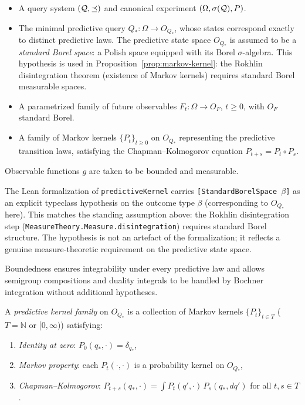 \begin{itemize}
\item A query system $(\mathcal{Q},\preceq)$ and canonical experiment $(\Omega,\sigma(\mathcal{Q}),P)$.
\item The minimal predictive query $Q_*:\Omega \to O_{Q_*}$, whose states
      correspond exactly to distinct predictive laws.  The predictive state space
      $O_{Q_*}$ is assumed to be a \emph{standard Borel space}: a Polish space
      equipped with its Borel $\sigma$-algebra.  This hypothesis is used in
      Proposition~\ref{prop:markov-kernel}: the Rokhlin disintegration theorem
      (existence of Markov kernels) requires standard Borel measurable spaces.
\item A parametrized family of future observables $F_t:\Omega\to O_F$,
      $t\ge0$, with $O_F$ standard Borel.
\item A family of Markov kernels $\{P_t\}_{t\ge0}$ on $O_{Q_*}$
      representing the predictive transition laws, satisfying the
      Chapman--Kolmogorov equation $P_{t+s} = P_t \circ P_s$.
\end{itemize}

Observable functions $g$ are taken to be bounded and measurable.

\begin{remark}
The Lean formalization of \texttt{predictiveKernel} carries
\texttt{[StandardBorelSpace $\beta$]} as an explicit typeclass hypothesis on the
outcome type $\beta$ (corresponding to $O_{Q_*}$ here).  This matches the
standing assumption above: the Rokhlin disintegration step
(\texttt{MeasureTheory.Measure.disintegration}) requires standard Borel structure.
The hypothesis is not an artefact of the formalization; it reflects a genuine
measure-theoretic requirement on the predictive state space.
\end{remark}
Boundedness ensures integrability under every predictive law and
allows semigroup compositions and duality integrals to be handled
by Bochner integration without additional hypotheses.

\begin{definition}\label{def:predictive-kernel-family}
A \emph{predictive kernel family} on $O_{Q_*}$ is a collection of
Markov kernels $\{P_t\}_{t\in T}$ ($T=\mathbb{N}$ or $[0,\infty)$)
satisfying:
\begin{enumerate}
\item \emph{Identity at zero}: $P_0(q_*,\cdot)=\delta_{q_*}$,
\item \emph{Markov property}: each $P_t(\cdot,\cdot)$ is a probability
      kernel on $O_{Q_*}$,
\item \emph{Chapman--Kolmogorov}: $P_{t+s}(q_*,\cdot)
      =\int P_t(q',\cdot)\,P_s(q_*,dq')$ for all $t,s\in T$.
\end{enumerate}
\end{definition}

